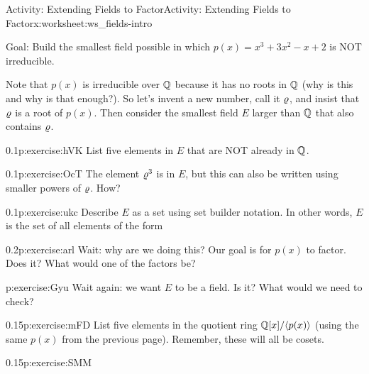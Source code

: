\documentclass[11pt]{book}
\begin{document}
%
%
\typeout{************************************************}
\typeout{************************************************}
%
\begin{worksheet-subsection}{Activity: Extending Fields to Factor}{}{Activity: Extending Fields to Factor}{}{}{x:worksheet:ws_fields-intro}
\begin{introduction}{}%
Goal: Build the smallest field possible in which \(p(x) = x^3 + 3x^2 - x + 2\) is NOT irreducible.%
\par
Note that \(p(x)\) is irreducible over \(\mathbb{Q}\) because it has no roots in \(\mathbb{Q}\) (why is this and why is that enough?).  So let's invent a new number, call it \(\varrho\), and insist that \(\varrho\) is a root of \(p(x)\).  Then consider the smallest field \(E\) larger than \(\mathbb{Q}\) that also contains \(\varrho\).%
\end{introduction}%
\begin{divisionexercise}{1}{}{0.1}{p:exercise:hVK}%
List five elements in \(E\) that are NOT already in \(\mathbb{Q}\).%
\end{divisionexercise}%
\begin{divisionexercise}{2}{}{0.1}{p:exercise:OcT}%
The element \(\varrho^3\) is in \(E\), but this can also be written using smaller powers of \(\varrho\).  How?%
\end{divisionexercise}%
\begin{divisionexercise}{3}{}{0.1}{p:exercise:ukc}%
Describe \(E\) as a set using set builder notation.  In other words, \(E\) is the set of all elements of the form \textellipsis{}%
\end{divisionexercise}%
\begin{divisionexercise}{4}{}{0.2}{p:exercise:arl}%
Wait: why are we doing this?  Our goal is for \(p(x)\) to factor.  Does it?  What would one of the factors be?%
\end{divisionexercise}%
\begin{divisionexercise}{5}{}{}{p:exercise:Gyu}%
Wait again: we want \(E\) to be a field.  Is it?  What would we need to check?%
\end{divisionexercise}%
\clearpage
\begin{divisionexercise}{6}{}{0.15}{p:exercise:mFD}%
List five elements in the quotient ring \(\mathbb{Q}[x]/\langle p(x)\rangle\) (using the same \(p(x)\) from the previous page).  Remember, these will all be cosets.%
\end{divisionexercise}%
\begin{divisionexercise}{7}{}{0.15}{p:exercise:SMM}%

\end{divisionexercise}
\end{worksheet-subsection}
\end{document}
